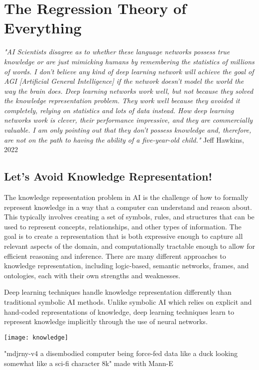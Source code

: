 \setchapterpreamble[u]{\margintoc}
\chapter{The Regression Theory of Everything}

\textit{"AI Scientists disagree as to whether these language networks possess true knowledge or are just mimicking humans by remembering the statistics of millions of words. I don't believe any kind of deep learning network will achieve the goal of AGI [Artificial General Intelligence] if the network doesn't model the world the way the brain does. Deep learning networks work well, but not because they solved the knowledge representation problem. They work well because they avoided it completely, relying on statistics and lots of data instead. How deep learning networks work is clever, their performance impressive, and they are commercially valuable. I am only pointing out that they don't possess knowledge and, therefore, are not on the path to having the ability of a five-year-old child."} Jeff Hawkins, 2022 \cite{hawkins2022}

\section{Let's Avoid Knowledge Representation!}

The knowledge representation problem in AI is the challenge of how to formally represent knowledge in a way that a computer can understand and reason about. This typically involves creating a set of symbols, rules, and structures that can be used to represent concepts, relationships, and other types of information. The goal is to create a representation that is both expressive enough to capture all relevant aspects of the domain, and computationally tractable enough to allow for efficient reasoning and inference. There are many different approaches to knowledge representation, including logic-based, semantic networks, frames, and ontologies, each with their own strengths and weaknesses.

Deep learning techniques handle knowledge representation differently than traditional symbolic AI methods. Unlike symbolic AI which relies on explicit and hand-coded representations of knowledge, deep learning techniques learn to represent knowledge implicitly through the use of neural networks.

\begin{pdf}
\begin{marginfigure}[-5.5cm]
        \texttt{[image: knowledge]}
        \caption{"mdjrny-v4 a disembodied computer being force-fed data like a duck looking somewhat like a sci-fi character 8k" made with Mann-E}
\end{marginfigure}
\end{pdf}

